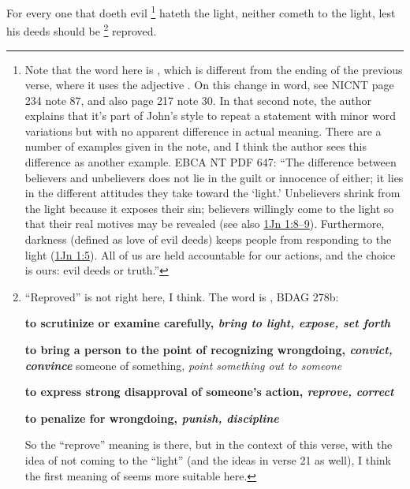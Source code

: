 			For every one that doeth evil%
				\footnote{%
					Note that the word here is \hyperref[PHAULOS]{}, which is different from the ending of the previous verse, where it uses the adjective \hyperref[PONEROS]{}. On this change in word, see NICNT page 234 note 87, and also page 217 note 30. In that second note, the author explains that it's part of John's style to repeat a statement with minor word variations but with no apparent difference in actual meaning. There are a number of examples given in the note, and I think the author sees this difference as another example. EBCA NT PDF 647: ``The difference between believers and unbelievers does not lie in the guilt or innocence of either; it lies in the different attitudes they take toward the `light.' Unbelievers shrink from the light because it exposes their sin; believers willingly come to the light so that their real motives may be revealed (see also \hyperref[1JOHN-1-8]{1Jn 1:8--9}). Furthermore, darkness (defined as love of evil deeds) keeps people from responding to the light (\hyperref[1JOHN-1-5]{1Jn 1:5}). All of us are held accountable for our actions, and the choice is ours: evil deeds or truth.''
					}
			hateth the light, neither cometh to the light, lest his deeds should be
				\footnote{%
					\label{ELENCHO}%
					``Reproved'' is not right here, I think. The word is , BDAG 278b:
						\begin{compactdesc}
							\item[1] \textbf{to scrutinize or examine carefully, \textit{bring to light, expose, set forth}}
							\item[2] \textbf{to bring a person to the point of recognizing wrongdoing, \textit{convict, convince}} someone of something, \textit{point something out to someone}
							\item[3] \textbf{to express strong disapproval of someone's action, \textit{reprove, correct}}
							\item[4] \textbf{to penalize for wrongdoing, \textit{punish, discipline}}
						\end{compactdesc}
					So the ``reprove'' meaning is there, but in the context of this verse, with the idea of not coming to the ``light'' (and the ideas in verse 21 as well), I think the first meaning of  seems more suitable here.
					}%
			reproved.

